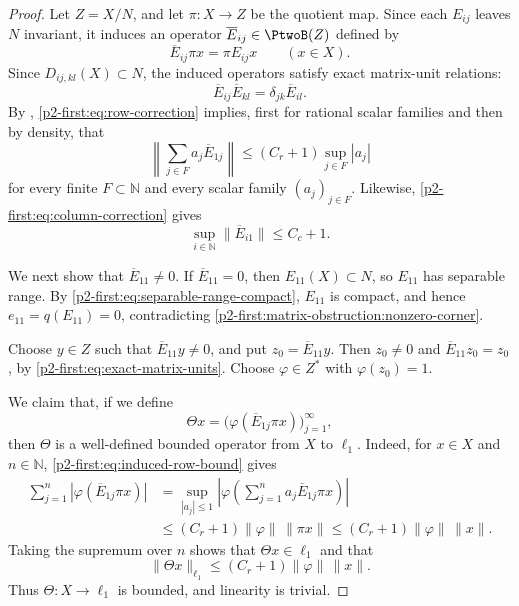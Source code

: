\documentclass[11pt,reqno]{amsart}
\makeatletter
\theoremstyle{plain}
\theoremstyle{definition}
\newcommand{\N}{\mathbb N}
\newcounter{problempaper}
\newenvironment{problempaperbody}{%
  \setcounter{subsection}{0}%
  \setcounter{subsubsection}{0}%
  \setcounter{paragraph}{0}%
  \renewcommand{\thesubsection}{\arabic{subsection}}%
  \renewcommand{\thesubsubsection}{\thesubsection.\arabic{subsubsection}}%
  \renewcommand{\theparagraph}{\thesubsubsection.\arabic{paragraph}}%
  \let\problem@outersection\section
  \let\problem@outersubsection\subsection
  \let\problem@outersubsubsection\subsubsection
  \let\problem@outerparagraph\paragraph
  \let\section\problem@papersection
  \let\subsection\problem@papersubsection
  \let\subsubsection\problem@papersubsubsection
}{%
  \let\section\problem@outersection
  \let\subsection\problem@outersubsection
  \let\subsubsection\problem@outersubsubsection
  \let\paragraph\problem@outerparagraph
}
\newcommand{\problem@target}[2]{%
  \hypertarget{problem-\theproblempaper-#1-#2}{}%
}
\newcommand{\problem@paperheading}[3]{%
  \par\bigskip
  \problem@target{#1}{#2}%
  \noindent{\large\bfseries #2.\quad #3\par}%
  \nobreak\smallskip
}
\newcommand{\problem@papersubheading}[3]{%
  \par\medskip
  \problem@target{#1}{#2}%
  \noindent{\normalsize\bfseries #2.\quad #3\par}%
  \nobreak\smallskip
}
\newcommand{\problem@papersubsubheading}[3]{%
  \par\smallskip
  \problem@target{#1}{#2}%
  \noindent{\normalsize\itshape #2.\quad #3.\ }%
}
\def\problem@papersection{%
  \@ifstar{\problem@papersectionstar}{\problem@papersectionnostar}%
}
\def\problem@papersectionstar#1{%
  \par\bigskip\noindent{\large\bfseries #1\par}\nobreak\smallskip
}
\def\problem@papersectionnostar#1{%
  \refstepcounter{subsection}%
  \setcounter{subsubsection}{0}%
  \setcounter{paragraph}{0}%
  \problem@paperheading{section}{\thesubsection}{#1}%
  \problem@writecontentsline{section}{\thesubsection}{#1}%
}
\def\problem@papersubsection{%
  \@ifstar{\problem@papersubsectionstar}{\problem@papersubsectionnostar}%
}
\def\problem@papersubsectionstar#1{%
  \par\medskip\noindent{\normalsize\bfseries #1\par}\nobreak\smallskip
}
\def\problem@papersubsectionnostar#1{%
  \refstepcounter{subsubsection}%
  \setcounter{paragraph}{0}%
  \problem@papersubheading{subsection}{\thesubsubsection}{#1}%
  \problem@writecontentsline{subsection}{\thesubsubsection}{#1}%
}
\def\problem@papersubsubsection{%
  \@ifstar{\problem@papersubsubsectionstar}{\problem@papersubsubsectionnostar}%
}
\def\problem@papersubsubsectionstar#1{%
  \par\smallskip\noindent{\normalsize\itshape #1.\ }%
}
\def\problem@papersubsubsectionnostar#1{%
  \refstepcounter{paragraph}%
  \problem@papersubsubheading{subsubsection}{\theparagraph}{#1}%
  \problem@writecontentsline{subsubsection}{\theparagraph}{#1}%
}
\newcommand{\problem@writecontentsline}[3]{%
  \begingroup
  \protected@write\@auxout{}{%
    \string\problemcontentsentry{\theproblempaper}{#1}{#2}{#3}{\thepage}%
  }%
  \endgroup
}
\newcommand{\problemcontentsentry}[5]{%
  \@ifundefined{problemcontents@#1}{%
    \expandafter\gdef\csname problemcontents@#1\endcsname{}%
  }{}%
  \expandafter\g@addto@macro\csname problemcontents@#1\endcsname{%
    \problemcontentsline{#1}{#2}{#3}{#4}{#5}%
  }%
}
\newcommand{\problemcontentslink}[4]{%
  \hyperlink{problem-#1-#2-#3}{#4}%
}
\newcommand{\problemcontentsline}[5]{%
  \ifstrequal{#2}{section}{%
    \par\noindent
    \problemcontentslink{#1}{#2}{#3}{\makebox[2.5em][l]{#3}#4}%
    \nobreak\dotfill
    \problemcontentslink{#1}{#2}{#3}{#5}\par
  }{%
    \ifstrequal{#2}{subsection}{%
      \par\noindent\hspace*{1.5em}%
      \problemcontentslink{#1}{#2}{#3}{\makebox[3.5em][l]{#3}#4}%
      \nobreak\dotfill
      \problemcontentslink{#1}{#2}{#3}{#5}\par
    }{%
      \par\noindent\hspace*{3em}%
      \problemcontentslink{#1}{#2}{#3}{\makebox[4.5em][l]{#3}#4}%
      \nobreak\dotfill
      \problemcontentslink{#1}{#2}{#3}{#5}\par
    }%
  }%
}
\makeatother
\begin{document}
\begin{problempaperbody}
\begin{proof}
Let $Z=X/N$, and let $\pi \colon X\to Z$ be the quotient map. Since each $E_{ij}$ leaves $N$ invariant, it induces an operator $\overline E_{ij}\in\PtwoB(Z)$ defined by
\begin{equation*}
        \overline E_{ij}\pi x=\pi E_{ij}x
        \qquad(x\in X).
\end{equation*}
Since $D_{ij,kl}(X)\subset N$, the induced operators satisfy exact matrix-unit relations:
\begin{equation}
\label{p2-first:eq:exact-matrix-units}
        \overline E_{ij}\overline E_{kl}=\delta_{jk}\overline E_{il}.
\end{equation}
By , \eqref{p2-first:eq:row-correction} implies, first for rational scalar families and then by density, that
\begin{equation}
\label{p2-first:eq:induced-row-bound}
        \left\|\sum_{j\in F}a_j\overline E_{1j}\right\|\leq(C_r+1)\sup_{j\in F}|a_j|
\end{equation}
for every finite $F\subset\N$ and every scalar family $(a_j)_{j\in F}$. Likewise, \eqref{p2-first:eq:column-correction} gives
\begin{equation}
\label{p2-first:eq:induced-column-bound}
        \sup_{i \in \N} \|\overline E_{i1}\|\leq C_c+1.
\end{equation}

We next show that $\overline E_{11}\ne0$. If $\overline E_{11}=0$, then $E_{11}(X)\subset N$, so $E_{11}$ has separable range. By \eqref{p2-first:eq:separable-range-compact}, $E_{11}$ is compact, and hence $e_{11}=q(E_{11})=0$, contradicting \ref{p2-first:matrix-obstruction:nonzero-corner}.

Choose $y\in Z$ such that $\overline E_{11}y\ne0$, and put $z_0=\overline E_{11}y$. Then $z_0\ne0$ and $\overline E_{11}z_0=z_0$, by \eqref{p2-first:eq:exact-matrix-units}. Choose $\varphi\in Z^*$ with $\varphi(z_0)=1$. 


We claim that, if we define
\begin{equation*}
        \Theta x=\bigl(\varphi(\overline E_{1j}\pi x)\bigr)_{j=1}^{\infty},
\end{equation*}
then $\Theta$ is a well-defined bounded operator from $X$ to $\ell_1$. Indeed, for $x\in X$ and $n\in\N$, \eqref{p2-first:eq:induced-row-bound} gives
\begin{equation*}
\begin{aligned}
        \sum_{j=1}^{n}|\varphi(\overline E_{1j}\pi x)|
        &=\sup_{|a_j|\leq1}\left|\varphi\left(\sum_{j=1}^{n}a_j\overline E_{1j}\pi x\right)\right|\\
        &\leq(C_r+1)\|\varphi\|\,\|\pi x\|
        \leq(C_r+1)\|\varphi\|\,\|x\|.
\end{aligned}
\end{equation*}
Taking the supremum over $n$ shows that $\Theta x\in\ell_1$ and that
\begin{equation*}
        \|\Theta x\|_{\ell_1}\leq(C_r+1)\|\varphi\|\,\|x\|.
\end{equation*}
Thus $\Theta\colon X\to\ell_1$ is bounded, and linearity is trivial.



\end{proof}
\end{problempaperbody}
\end{document}
